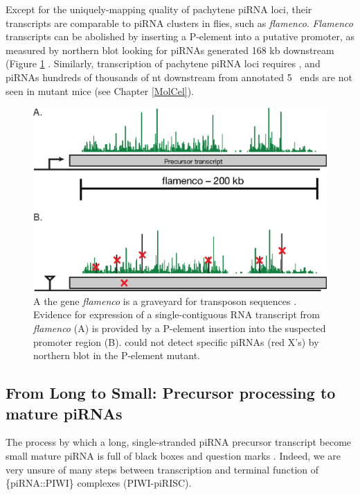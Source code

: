     Except for the uniquely-mapping quality of pachytene piRNA loci, their transcripts are comparable to piRNA clusters in flies, such as \textit{flamenco}. \textit{Flamenco} transcripts can be abolished by inserting a P-element into a putative promoter, as measured by northern blot looking for piRNAs generated 168 kb downstream (Figure \ref{Intro:fig:flamenco} \citep{Brennecke2007,Goriaux2014}. Similarly, transcription of pachytene piRNA loci requires \amyb{}, and piRNAs hundreds of thousands of nt downstream from annotated 5\textprime~ ends are not seen in \amyb{} mutant mice (see Chapter \ref{MolCel}).

    \begin{figure} %
      \centering 
      \includegraphics{Figures/Intro/FlamencoLocus.eps}
      \caption[Genetic evidence for long, continuous fly piRNA precursor transcripts]
      {
        A the \flies{} gene \textit{flamenco} is a graveyard for transposon sequences \citep{Pelisson1994}. Evidence for expression of a single-contiguous RNA transcript from \textit{flamenco} (A) is provided by a P-element insertion into the suspected promoter region (B). \citep{Brennecke2007} could not detect specific piRNAs (red X's) by northern blot in the P-element mutant.
        }
      \label{Intro:fig:flamenco}
      \end{figure}

  \subsection{From Long to Small: Precursor processing to mature piRNAs}
    \label{Intro:subsec:Processing of piRNAs in mice}

    The process by which a long, single-stranded piRNA precursor transcript become small mature piRNA is full of black boxes and question marks \citep{Li2013e}. Indeed, we are very unsure of many steps between transcription and terminal function of \{piRNA::PIWI\} complexes (PIWI-piRISC).

